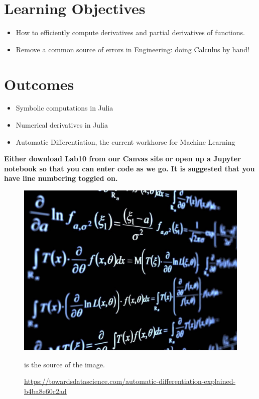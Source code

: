 \section*{Learning Objectives}

\begin{itemize}
\item How to efficiently compute derivatives and partial derivatives of functions.
\item Remove a common source of errors in Engineering: doing Calculus by hand!
\end{itemize}

\section*{Outcomes} 
\begin{itemize}
\item Symbolic computations in Julia

\item Numerical derivatives in Julia

\item Automatic Differentiation, the current workhorse for Machine Learning
\end{itemize}

\vspace*{1cm}

\textbf{Either download Lab10 from our Canvas site or open up a Jupyter notebook so that you can enter code as we go. It is suggested that you have line numbering toggled on.}  

\begin{figure}
    \centering
    \includegraphics[width=0.7\columnwidth]{graphics/Chap10/AutomaticDifferentiationChiFengWang.jpeg}
    \caption{
   \url{https://towardsdatascience.com/automatic-differentiation-explained-b4ba8e60c2ad}
    } is the source of the image.
    \label{fig:my_label}
\end{figure}

